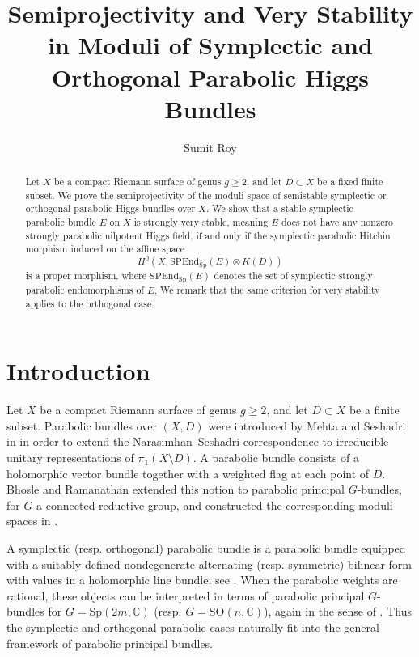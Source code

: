 \documentclass[11pt, reqno]{amsart}
\numberwithin{equation}{section}
\newcommand{\Sp}{\mathrm{Sp}}
\newcommand{\SO}{\mathrm{SO}}
\theoremstyle{definition}
\begin{document}
\title[Very stable and semiprojectivity]{Semiprojectivity and Very Stability in Moduli of Symplectic and Orthogonal Parabolic Higgs Bundles}
\author[S. Roy]{Sumit Roy}

 \address{Stat-Math Unit, Indian Statistical Institute, 203 B.T. Road, Kolkata 700 108, India.}

\begin{abstract}
Let $X$ be a compact Riemann surface of genus $g \geq 2$, and let $D \subset X$ be a fixed finite subset. We prove the semiprojectivity of the moduli space of semistable symplectic or orthogonal parabolic Higgs bundles over $X$. We show that a stable symplectic parabolic bundle $E$ on $X$ is strongly very stable, meaning $E$ does not have any nonzero strongly parabolic nilpotent Higgs field, if and only if the symplectic parabolic Hitchin morphism induced on the affine space $$H^0(X,\mathrm{SPEnd}_\mathrm{Sp}(E) \otimes K(D))$$ is a proper morphism, where $\mathrm{SPEnd}_\mathrm{Sp}(E)$ denotes the set of symplectic strongly parabolic endomorphisms of $E$. We remark that the same criterion for very stability applies to the orthogonal case.
\end{abstract}
\maketitle

\section{Introduction}

Let $X$ be a compact Riemann surface of genus $g \geq 2$, and let $D \subset X$ be a finite subset. Parabolic bundles over $(X,D)$ were introduced by Mehta and Seshadri in \cite{MS80} in order to extend the Narasimhan--Seshadri correspondence to irreducible unitary representations of $\pi_1(X\setminus D)$. A parabolic bundle consists of a holomorphic vector bundle together with a weighted flag at each point of $D$. Bhosle and Ramanathan extended this notion to parabolic principal $G$-bundles, for $G$ a connected reductive group, and constructed the corresponding moduli spaces in \cite{BR89}. 

A symplectic (resp. orthogonal) parabolic bundle is a parabolic bundle equipped with a suitably defined nondegenerate alternating (resp. symmetric) bilinear form with values in a holomorphic line bundle; see \cite{BMW11}. When the parabolic weights are rational, these objects can be interpreted in terms of parabolic principal $G$-bundles for $G=\Sp(2m,\mathbb{C})$ (resp. $G=\SO(n,\mathbb{C})$), again in the sense of \cite{BMW11}. Thus the symplectic and orthogonal parabolic cases naturally fit into the general framework of parabolic principal bundles.
\end{document}
